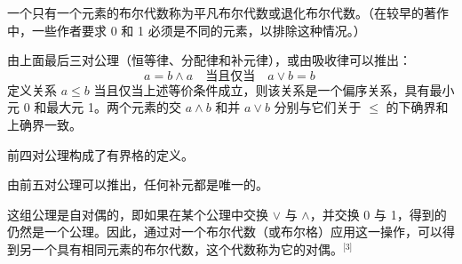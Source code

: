 一个只有一个元素的布尔代数称为平凡布尔代数或退化布尔代数。（在较早的著作中，一些作者要求 0 和 1 必须是不同的元素，以排除这种情况。）

由上面最后三对公理（恒等律、分配律和补元律），或由吸收律可以推出：
$$
a = b \land a \quad \text{当且仅当} \quad a \lor b = b~
$$
定义关系 $a \le b$ 当且仅当上述等价条件成立，则该关系是一个偏序关系，具有最小元 0 和最大元 1。两个元素的交 $a \land b$ 和并 $a \lor b$ 分别与它们关于 $\le$ 的下确界和上确界一致。

前四对公理构成了有界格的定义。

由前五对公理可以推出，任何补元都是唯一的。

这组公理是自对偶的，即如果在某个公理中交换 $\lor$ 与 $\land$，并交换 0 与 1，得到的仍然是一个公理。因此，通过对一个布尔代数（或布尔格）应用这一操作，可以得到另一个具有相同元素的布尔代数，这个代数称为它的对偶。\(^\text{[3]}\)
